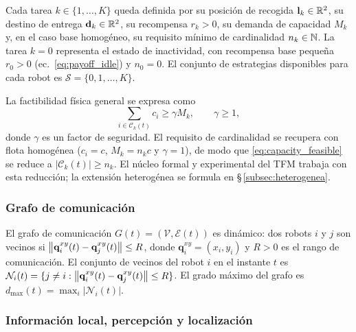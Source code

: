 Cada tarea $k \in \{1, \ldots, K\}$ queda definida por su posición de recogida
$\mathbf{l}_k \in \mathbb{R}^2$, su destino de entrega $\mathbf{d}_k \in \mathbb{R}^2$,
su recompensa $r_k > 0$, su demanda de capacidad $M_k$ y, en el caso base homogéneo,
su requisito mínimo de cardinalidad $n_k \in \mathbb{N}$. La tarea $k = 0$ representa el
estado de inactividad, con recompensa base pequeña $r_0 > 0$
(ec.~\eqref{eq:payoff_idle}) y $n_0 = 0$. El conjunto de estrategias disponibles para
cada robot es $\mathcal{S} = \{0, 1, \ldots, K\}$.

La factibilidad física general se expresa como
\begin{equation}
  \sum_{i\in\mathcal{C}_k(t)} c_i \geq \gamma M_k,\qquad \gamma \geq 1,
  \label{eq:capacity_feasible}
\end{equation}
donde $\gamma$ es un factor de seguridad. El requisito de cardinalidad se recupera con
flota homogénea ($c_i = c$, $M_k = n_kc$ y $\gamma=1$), de modo que
\eqref{eq:capacity_feasible} se reduce a $|\mathcal{C}_k(t)| \geq n_k$. El núcleo
formal y experimental del TFM trabaja con esta reducción; la extensión heterogénea se
formula en \S\,\ref{subsec:heterogenea}.

\subsubsection{Grafo de comunicación}

El grafo de comunicación $G(t) = (\mathcal{V}, \mathcal{E}(t))$ es dinámico:
dos robots $i$ y $j$ son vecinos si $\left\|\mathbf{q}_i^{xy}(t) - \mathbf{q}_j^{xy}(t)\right\|
\leq R$, donde $\mathbf{q}_i^{xy} = (x_i, y_i)$ y $R > 0$ es el rango de
comunicación. El conjunto de vecinos del robot $i$ en el instante $t$ es
$\mathcal{N}_i(t) = \{j \neq i : \left\|\mathbf{q}_i^{xy}(t) - \mathbf{q}_j^{xy}(t)\right\| \leq R\}$.
El grado máximo del grafo es $d_{\max}(t) = \max_i |\mathcal{N}_i(t)|$.

\subsubsection{Información local, percepción y localización}

